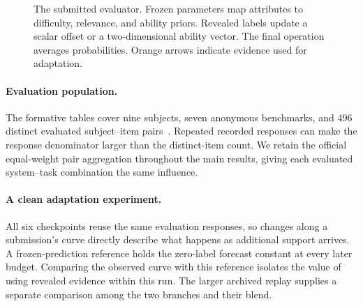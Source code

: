 \begin{figure}[H]
\centering
{}
\caption{The submitted evaluator. Frozen parameters map attributes to difficulty, relevance, and ability priors. Revealed labels update a scalar offset or a two-dimensional ability vector. The final operation averages probabilities. Orange arrows indicate evidence used for adaptation.}
\label{fig:overview}
\end{figure}

\paragraph{Evaluation population.}
The formative tables cover nine subjects, seven anonymous benchmarks, and 496 distinct evaluated subject--item pairs~\citep{release}. Repeated recorded responses can make the response denominator larger than the distinct-item count. We retain the official equal-weight pair aggregation throughout the main results, giving each evaluated system--task combination the same influence.

\paragraph{A clean adaptation experiment.}
All six checkpoints reuse the same evaluation responses, so changes along a submission's curve directly describe what happens as additional support arrives. A frozen-prediction reference holds the zero-label forecast constant at every later budget. Comparing the observed curve with this reference isolates the value of using revealed evidence within this run. The larger archived replay supplies a separate comparison among the two branches and their blend.
